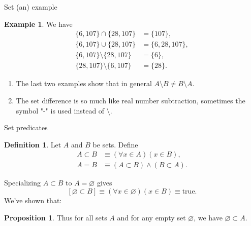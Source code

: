 \documentclass[fleqn]{beamer}
\theoremstyle{definition}
\newtheorem{mydef}{Definition}
\newtheorem{myex}{Example}
\newtheorem{myth}{Proposition}
\newenvironment{checklist}{
  \begin{enumerate}[\ding{51}]
    \addtolength{\itemsep}{-0.0\itemsep}}
  {\end{enumerate}}
\begin{document}
\begin{frame}{Set (an) example}

\begin{myex}
We have
\begin{align*}
   \{6, 107\} \cap  \{28,107\} &= \{107\}, \\
      \{6, 107\} \cup  \{28,107\} &= \{6,28, 107\}, \\
         \{6, 107\} \setminus  \{28,107\} &= \{6\}, \\
            \{28, 107\} \setminus  \{6,107\} &= \{28\}.
\end{align*}
\end{myex}

\begin{checklist}

\item The last two examples show that in  general  \(A \setminus B \neq B \setminus A\).

\item The set difference is so much like real number subtraction, sometimes the symbol "-" is used instead of \(\setminus\).

\end{checklist}
\end{frame}


\begin{frame}{Set predicates}

\begin{mydef}
Let \(A\) and \(B\) be sets. Define
\begin{align*}
   A \subset B &\equiv (\forall x \in A)(x \in B),\\
   A = B &\equiv  (A \subset B) \land (B \subset A).
\end{align*}
\end{mydef}

Specializing \(A \subset B\) to \(A = \varnothing\) gives
\[
   \left[\varnothing \subset B \right] \equiv  (\forall x \in \varnothing)(x \in B) \equiv \mbox{true}.
\]
We've shown that:

\begin{myth} Thus for all sets \(A\) and for any empty set \(\varnothing\), we have \(\varnothing \subset A\).  \end{myth}


\end{frame}
\end{document}
